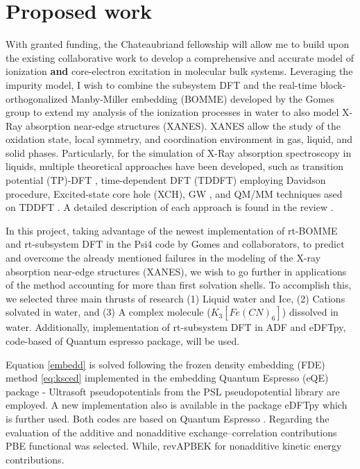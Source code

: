 \documentclass[notitlepage,12pt]{report}
\begin{document}
    \section{Proposed work}
    With granted funding, the Chateaubriand fellowship will allow me to build upon the existing collaborative work to develop a comprehensive and accurate model of ionization {\bf and } core-electron excitation in molecular bulk systems. Leveraging the impurity model, I wish to combine the subsystem DFT and the real-time block-orthogonalized Manby-Miller embedding (BOMME) \supercite{ding2017embedded,koh2017accelerating} developed by the Gomes group to extend my analysis of the ionization processes in water to also model X-Ray absorption near-edge structures (XANES)\supercite{fransson2016x}. XANES allow the study of the oxidation state, local symmetry, and coordination environment in gas, liquid, and solid phases\supercite{rehr2005progress,koningsberger1987x}. 
    Particularly, for the simulation of X-Ray absorption spectroscopy in liquids, multiple theoretical approaches have been developed, such as transition potential (TP)-DFT \supercite{triguero1998calculations}, time-dependent DFT (TDDFT) employing Davidson procedure\supercite{davidson197514}, Excited-state core hole (XCH)\supercite{prendergast2006x}, GW \supercite{vinson2012theoretical,chen2010x}, and QM/MM techniques ased on TDDFT \supercite{list2014lanczos}. A detailed description of each approach is found in the review \cite{fransson2016x}.
	
	In this project, taking advantage of the newest implementation of rt-BOMME and rt-subsystem DFT \supercite{de2021environment} in the Psi4 code \supercite{smith2020psi4} by Gomes and collaborators, to predict and overcome the already mentioned failures in the modeling of the X-ray absorption near-edge structures (XANES), we wish to go further in applications of the method accounting for more than first solvation shells. To accomplish this, we selected three main thrusts of research (1) Liquid water and Ice, (2) Cations solvated in water, and (3) A complex molecule ($K_3[Fe(CN)_6]$) dissolved in water. Additionally, implementation of rt-subsystem DFT in ADF\supercite{te2001chemistry} and eDFTpy\supercite{edftpy}, code-based of Quantum espresso package\supercite{giannozzi2009quantum}, will be used.

Equation \ref{embedd} is solved following the frozen density embedding (FDE) method \ref{eq:ksced} implemented in the embedding Quantum Espresso (eQE) package \supercite{genova2017eqe}- Ultrasoft pseudopotentials from the PSL pseudopotential library \supercite{corso2014comput} are employed. A new implementation also is available in the package eDFTpy\supercite{edftpy} which is further used. Both codes are based on Quantum Espresso \supercite{qe}. Regarding the evaluation of the additive and nonadditive exchange--correlation contributions PBE functional \supercite{perdew1996phys} was selected. While, revAPBEK \supercite{laricchia2011generalized} for nonadditive kinetic energy contributions. 
\end{document}
